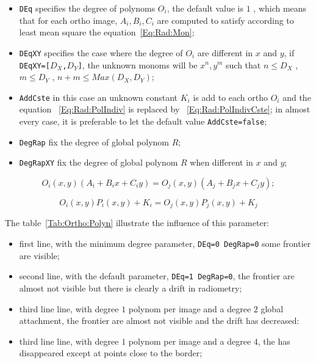 \begin{itemize}
  \item {\tt DEq} specifies the degree of polynoms $O_i$, the default value is
        $1$ , which means that for each ortho image, $A_i,B_i,C_i$ are computed
        to satisfy according to least mean square the equation~\ref{Eq:Rad:Mon};

   \item {\tt DEqXY} specifies the case where the degree of $O_i$ are different in
         $x$ and $y$, if  {\tt DEqXY=[$D_X$,$D_Y$]}, the unknown monoms will
         be $x^n,y^m$ such that $n\leq D_X$ , $m\leq D_Y$ ,   $n+m\leq Max(D_X,D_Y)$;

   \item {\tt AddCste} in this case an unknown constant $K_i$ is add to each ortho $O_i$ and
          the equation ~\ref{Eq:Rad:PolIndiv} is replaced by ~\ref{Eq:Rad:PolIndivCste};
          in almost every case, it is preferable to let the default value {\tt AddCste=false};

   \item {\tt DegRap} fix the degree of global polynom $R$;

   \item {\tt DegRapXY} fix the degree of global polynom $R$ when different in $x$ and $y$;
    
\end{itemize}



\begin{equation}
O_i(x,y)(A_i+B_ix+C_iy)=O_j(x,y)(A_j+B_jx+C_jy);
\label{Eq:Rad:Mon}
\end{equation}

\begin{equation}
   O_i(x,y) P_i(x,y) + K_i = O_j(x,y) P_j(x,y) + K_j
\label{Eq:Rad:PolIndivCste}
\end{equation}

The table~\ref{Tab:Ortho:Polyn} illustrate the influence of this parameter:

\begin{itemize}
   \item first line, with the minimum degree parameter, {\tt DEq=0 DegRap=0} some
         frontier are visible;
   \item second line, with the default parameter, {\tt DEq=1 DegRap=0}, the frontier
         are almost not visible but there is clearly a drift in radiometry;
   \item third line line, with  degree $1$ polynom per image and a degree $2$ global
         attachment, the frontier are almost not visible and the drift has decreased:
   \item third line line, with  degree $1$ polynom per image and a degree $4$, the
         has disappeared except at points close to the border;
\end{itemize}

